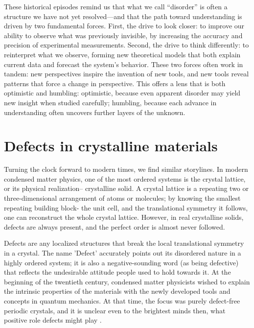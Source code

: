 These historical episodes remind us that what we call “disorder” is often a structure we have not yet resolved—and that the path toward understanding is driven by two fundamental forces. First, the drive to look closer: to improve our ability to observe what was previously invisible, by increasing the accuracy and precision of experimental measurements. Second, the drive to think differently: to reinterpret what we observe, forming new theoretical models that both explain current data and forecast the system’s behavior. These two forces often work in tandem: new perspectives inspire the invention of new tools, and new tools reveal patterns that force a change in perspective. This offers a lens that is both optimistic and humbling: optimistic, because even apparent disorder may yield new insight when studied carefully; humbling, because each advance in understanding often uncovers further layers of the unknown.

\section{Defects in crystalline materials}
Turning the clock forward to modern times, we find similar storylines. In modern condensed matter physics, one of the most ordered systems is the crystal lattice, or its physical realization-- crystalline solid. A crystal lattice is a repeating two or three-dimensional arrangement of atoms or molecules; by knowing the smallest repeating building block- the unit cell, and the translational symmetry it follows, one can reconstruct the whole crystal lattice. However, in real crystalline solids, defects are always present, and the perfect order is almost never followed. 

Defects are any localized structures that break the local translational symmetry in a crystal. The name 'Defect' accurately points out its disordered nature in a highly ordered system; it is also a negative-sounding word (as being defective) that reflects the undesirable attitude people used to hold towards it. At the beginning of the twentieth century, condensed matter physicists wished to explain the intrinsic properties of the materials with the newly developed tools and concepts in quantum mechanics. At that time, the focus was purely defect-free periodic crystals, and it is unclear even to the brightest minds then, what positive role defects might play \cite{lorentzVortrageUberKinetische1914, spitalerPerspectivesTheoryDefects2018}. 

\vspace{1cm}

